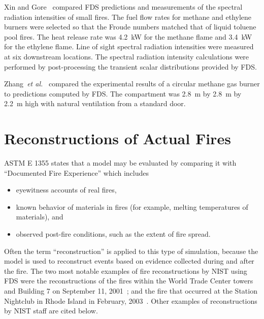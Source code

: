 Xin   and  Gore~\cite{Xin:JSS2003}   compared   FDS  predictions   and measurements  of the  spectral radiation  intensities of  small fires. The
fuel flow rates for  methane and ethylene burners were selected so that the  Froude numbers  matched that of  liquid toluene  pool fires. The heat
release rate was 4.2~kW  for the methane flame and 3.4~kW for the ethylene flame.  Line of sight spectral radiation intensities were measured  at
six  downstream  locations.    The  spectral  radiation intensity calculations were performed by post-processing the transient scalar  distributions
provided  by FDS.

Zhang~{\em et al.}~\cite{Zhang:1} compared the experimental results of a  circular methane  gas burner  to predictions  computed by  FDS. The
compartment was 2.8~m by 2.8~m  by 2.2~m high with natural ventilation from a  standard door.




\section{Reconstructions of Actual Fires}

ASTM E 1355 states that a model may be evaluated by comparing it with ``Documented Fire Experience'' which includes
\begin{itemize}
\item eyewitness accounts of real fires,
\item known behavior of materials in fires (for example, melting temperatures of materials), and
\item observed post-fire conditions, such as the extent of fire spread.
\end{itemize}
Often the term ``reconstruction'' is applied to this type of simulation, because the model is used to reconstruct events based on evidence collected during and after the
fire. The two most
notable examples of fire reconstructions by NIST using FDS were the reconstructions of the fires within the World Trade Center towers and Building 7 on September 11, 2001~\cite{NIST_NCSTAR_1-5F};
and the fire that occurred at the Station Nightclub in Rhode Island in February, 2003~\cite{Grosshandler:Station}. Other examples of reconstructions by NIST staff are
cited below.


